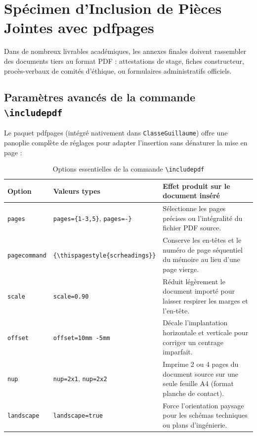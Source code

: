 \chapter{Spécimen d'Inclusion de Pièces Jointes avec \textsf{pdfpages}}
\label{annexe:specimen_externe}

Dans de nombreux livrables académiques, les annexes finales doivent rassembler des documents tiers au format PDF :
attestations de stage, fiches constructeur, procès-verbaux de comités d'éthique, ou formulaires administratifs officiels.

\section{Paramètres avancés de la commande \texttt{\textbackslash includepdf}}
\label{sec:parametres_pdfpages}

Le paquet \textsf{pdfpages} (intégré nativement dans \texttt{ClasseGuillaume}) offre une panoplie complète de réglages pour adapter l'insertion sans dénaturer la mise en page :

\begin{table}[htbp]
  \centering
  \small
  \caption{Options essentielles de la commande \texttt{\textbackslash includepdf}}
  \label{tab:options_pdfpages}
  \begin{tabularx}{\textwidth}{L{2.8cm} L{5.5cm} Y}
    \toprule
    \textbf{Option} & \textbf{Valeurs types} & \textbf{Effet produit sur le document inséré} \\
    \midrule
    \texttt{pages} & \texttt{pages=\{1-3,5\}}, \texttt{pages=-\}} & Sélectionne les pages précises ou l'intégralité du fichier PDF source. \\
    \addlinespace
    \texttt{pagecommand} & \texttt{\{\textbackslash thispagestyle\{scrheadings\}\}} & Conserve les en-têtes et le numéro de page séquentiel du mémoire au lieu d'une page vierge. \\
    \addlinespace
    \texttt{scale} & \texttt{scale=0.90} & Réduit légèrement le document importé pour laisser respirer les marges et l'en-tête. \\
    \addlinespace
    \texttt{offset} & \texttt{offset=10mm -5mm} & Décale l'implantation horizontale et verticale pour corriger un centrage imparfait. \\
    \addlinespace
    \texttt{nup} & \texttt{nup=2x1}, \texttt{nup=2x2} & Imprime 2 ou 4 pages du document source sur une seule feuille A4 (format planche de contact). \\
    \addlinespace
    \texttt{landscape} & \texttt{landscape=true} & Force l'orientation paysage pour les schémas techniques ou plans d'ingénierie. \\
    \bottomrule
  \end{tabularx}
\end{table}

